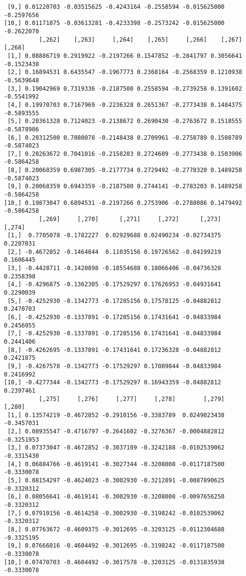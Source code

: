 \documentclass[
  letterpaper,
  DIV=11,
  numbers=noendperiod]{scrreprt}
\begin{document}
\begin{verbatim}
 [9,] 0.01220703 -0.03515625 -0.4243164 -0.2558594 -0.015625000 -0.2597656
[10,] 0.01171875 -0.03613281 -0.4233398 -0.2573242 -0.015625000 -0.2622070
          [,262]    [,263]     [,264]    [,265]     [,266]    [,267]     [,268]
 [1,] 0.08886719 0.2919922 -0.2197266 0.1547852 -0.2841797 0.3056641 -0.1523438
 [2,] 0.16894531 0.6435547 -0.1967773 0.2368164 -0.2568359 0.1210938 -0.5639648
 [3,] 0.19042969 0.7319336 -0.2187500 0.2558594 -0.2739258 0.1391602 -0.5541992
 [4,] 0.19970703 0.7167969 -0.2236328 0.2651367 -0.2773438 0.1484375 -0.5893555
 [5,] 0.20361328 0.7124023 -0.2138672 0.2690430 -0.2763672 0.1518555 -0.5878906
 [6,] 0.20312500 0.7080078 -0.2148438 0.2709961 -0.2758789 0.1508789 -0.5874023
 [7,] 0.20263672 0.7041016 -0.2158203 0.2724609 -0.2773438 0.1503906 -0.5864258
 [8,] 0.20068359 0.6987305 -0.2177734 0.2729492 -0.2778320 0.1489258 -0.5874023
 [9,] 0.20068359 0.6943359 -0.2187500 0.2744141 -0.2783203 0.1489258 -0.5864258
[10,] 0.19873047 0.6894531 -0.2197266 0.2753906 -0.2788086 0.1479492 -0.5864258
          [,269]     [,270]      [,271]     [,272]      [,273]    [,274]
 [1,]  0.7705078 -0.1782227  0.02929688 0.02490234 -0.02734375 0.2207031
 [2,] -0.4672852 -0.1464844  0.11035156 0.19726562 -0.04199219 0.1606445
 [3,] -0.4428711 -0.1420898 -0.18554688 0.18066406 -0.04736328 0.2358398
 [4,] -0.4296875 -0.1362305 -0.17529297 0.17626953 -0.04931641 0.2290039
 [5,] -0.4252930 -0.1342773 -0.17285156 0.17578125 -0.04882812 0.2470703
 [6,] -0.4252930 -0.1337891 -0.17285156 0.17431641 -0.04833984 0.2456055
 [7,] -0.4252930 -0.1337891 -0.17285156 0.17431641 -0.04833984 0.2441406
 [8,] -0.4262695 -0.1337891 -0.17431641 0.17236328 -0.04882812 0.2421875
 [9,] -0.4267578 -0.1342773 -0.17529297 0.17089844 -0.04833984 0.2416992
[10,] -0.4277344 -0.1342773 -0.17529297 0.16943359 -0.04882812 0.2397461
          [,275]     [,276]     [,277]     [,278]        [,279]     [,280]
 [1,] 0.13574219 -0.4672852 -0.2910156 -0.3383789  0.0249023438 -0.3457031
 [2,] 0.08935547 -0.4716797 -0.2641602 -0.3276367 -0.0004882812 -0.3251953
 [3,] 0.07373047 -0.4672852 -0.3037109 -0.3242188 -0.0102539062 -0.3315430
 [4,] 0.06884766 -0.4619141 -0.3027344 -0.3208008 -0.0117187500 -0.3330078
 [5,] 0.08154297 -0.4624023 -0.3002930 -0.3212891 -0.0087890625 -0.3320312
 [6,] 0.08056641 -0.4619141 -0.3002930 -0.3208008 -0.0097656250 -0.3320312
 [7,] 0.07910156 -0.4614258 -0.3002930 -0.3198242 -0.0102539062 -0.3320312
 [8,] 0.07763672 -0.4609375 -0.3012695 -0.3203125 -0.0112304688 -0.3325195
 [9,] 0.07666016 -0.4604492 -0.3012695 -0.3198242 -0.0117187500 -0.3330078
[10,] 0.07470703 -0.4604492 -0.3017578 -0.3203125 -0.0131835938 -0.3330078

\end{verbatim}
\end{document}
